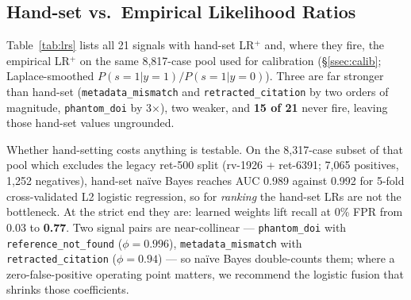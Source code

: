 \documentclass[runningheads]{llncs}
\begin{document}
\subsection{Hand-set vs.\ Empirical Likelihood Ratios}

Table~\ref{tab:lrs} lists all 21 signals with hand-set LR$^{+}$ and, where they fire, the empirical LR$^{+}$ on the same 8{,}817-case pool used for calibration (\S\ref{ssec:calib}; Laplace-smoothed $P(s{=}1|y{=}1)/P(s{=}1|y{=}0)$). Three are far stronger than hand-set (\texttt{metadata\_\allowbreak mismatch} and \texttt{retracted\_\allowbreak citation} by two orders of magnitude, \texttt{phantom\_doi} by 3$\times$), two weaker, and \textbf{15 of 21} never fire, leaving those hand-set values ungrounded.

Whether hand-setting costs anything is testable. On the 8{,}317-case subset of that pool which excludes the legacy ret-500 split (rv-1926 + ret-6391; 7{,}065 positives, 1{,}252 negatives), hand-set na\"ive Bayes reaches AUC 0.989 against 0.992 for 5-fold cross-validated L2 logistic regression, so for \emph{ranking} the hand-set LRs are not the bottleneck. At the strict end they are: learned weights lift recall at 0\% FPR from 0.03 to \textbf{0.77}. Two signal pairs are near-collinear --- \texttt{phantom\_doi} with \texttt{reference\_\allowbreak not\_\allowbreak found} ($\phi{=}0.996$), \texttt{metadata\_\allowbreak mismatch} with \texttt{retracted\_\allowbreak citation} ($\phi{=}0.94$) --- so na\"ive Bayes double-counts them; where a zero-false-positive operating point matters, we recommend the logistic fusion that shrinks those coefficients.
\end{document}
